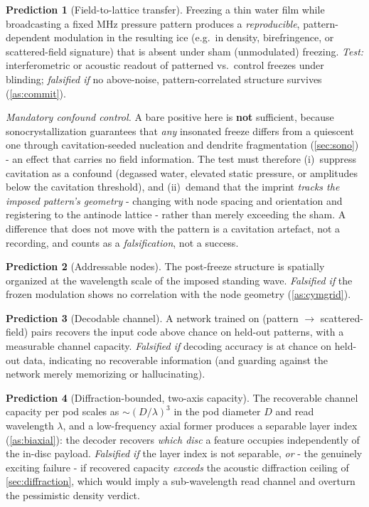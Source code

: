 \documentclass[11pt]{article}
\theoremstyle{definition}
\newtheorem{prediction}{Prediction}
\begin{document}
\begin{prediction}[Field-to-lattice transfer]\label{pr:transfer}
Freezing a thin water film while broadcasting a fixed MHz pressure pattern produces a
\emph{reproducible}, pattern-dependent modulation in the resulting ice (e.g.\ in density,
birefringence, or scattered-field signature) that is absent under sham (unmodulated)
freezing. \emph{Test:} interferometric or acoustic readout of patterned vs.\ control
freezes under blinding; \emph{falsified if} no above-noise, pattern-correlated structure
survives (\cref{as:commit}).

\emph{Mandatory confound control.} A bare positive here is \textbf{not} sufficient, because
sonocrystallization guarantees that \emph{any} insonated freeze differs from a quiescent one
through cavitation-seeded nucleation and dendrite fragmentation
(\cref{sec:sono})~\cite{zhang2021uafmech} - an effect that carries no field information. The
test must therefore (i)~suppress cavitation as a confound (degassed water, elevated static
pressure, or amplitudes below the cavitation threshold), and (ii)~demand that the imprint
\emph{tracks the imposed pattern's geometry} - changing with node spacing and orientation and
registering to the antinode lattice - rather than merely exceeding the sham. A difference
that does not move with the pattern is a cavitation artefact, not a recording, and counts as a
\emph{falsification}, not a success.
\end{prediction}

\begin{prediction}[Addressable nodes]\label{pr:nodes}
The post-freeze structure is spatially organized at the wavelength scale of the imposed
standing wave. \emph{Falsified if} the frozen modulation shows no correlation with the node
geometry (\cref{as:cymgrid}).
\end{prediction}

\begin{prediction}[Decodable channel]\label{pr:decode}
A network trained on (pattern $\rightarrow$ scattered-field) pairs recovers the input code
above chance on held-out patterns, with a measurable channel capacity. \emph{Falsified if}
decoding accuracy is at chance on held-out data, indicating no recoverable information (and
guarding against the network merely memorizing or hallucinating).
\end{prediction}

\begin{prediction}[Diffraction-bounded, two-axis capacity]\label{pr:capacity}
The recoverable channel capacity per pod scales as ${\sim}(D/\lambda)^3$ in the pod diameter
$D$ and read wavelength $\lambda$, and a low-frequency axial former produces a separable
layer index (\cref{as:biaxial}): the decoder recovers \emph{which disc} a feature occupies
independently of the in-disc payload. \emph{Falsified if} the layer index is not separable,
\emph{or} - the genuinely exciting failure - if recovered capacity \emph{exceeds} the
acoustic diffraction ceiling of \cref{sec:diffraction}, which would imply a sub-wavelength
read channel and overturn the pessimistic density verdict.
\end{prediction}
\end{document}
